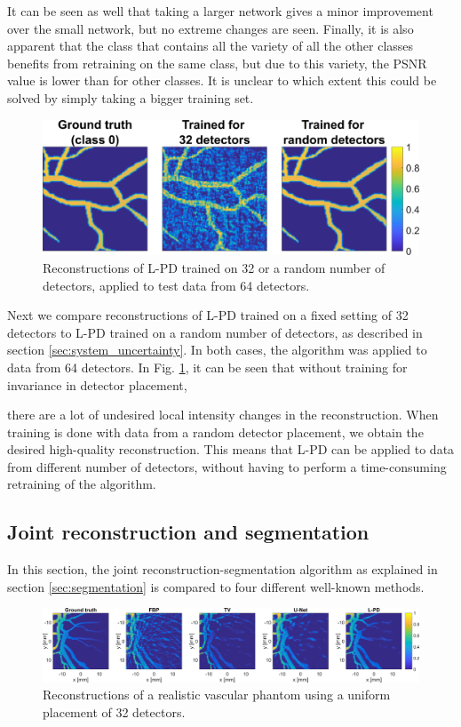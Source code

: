 \documentclass[journal]{IEEEtran}
\newcommand{\hl}[1]{\cbcolor{red}\begin{changebar}{#1}\end{changebar}}
\begin{document}
It can be seen as well that taking a larger network gives a minor improvement over the small network, but no extreme changes are seen. Finally, it is also apparent that the class that contains all the variety of all the other classes benefits from retraining on the same class, but due to this variety, the PSNR value is lower than for other classes. It is unclear to which extent this could be solved by simply taking a bigger training set. 

\begin{figure}[ht!]
\centering
\includegraphics[width=\linewidth]{images/system_changes_im.png}
\caption{Reconstructions of L-PD trained on 32 or a random number of detectors, applied to test data from 64 detectors.}
\label{fig:system_changes_result}
\end{figure}

Next we compare reconstructions of L-PD trained on a fixed setting of 32 detectors to L-PD trained on a random number of detectors, as described in section \ref{sec:system_uncertainty}. In both cases, the algorithm was applied to data from 64 detectors. In Fig. \ref{fig:system_changes_result}, it can be seen that without training for invariance in detector placement, \hl{there are a lot of undesired local intensity changes in the reconstruction. When training is done with data from a random detector placement, we obtain the desired high-quality reconstruction. This means that L-PD can be applied to data from different number of detectors, without having to perform a time-consuming retraining of the algorithm. }

\subsection{Joint reconstruction and segmentation}
In this section, the joint reconstruction-segmentation algorithm as explained in section \ref{sec:segmentation} is compared to four different well-known methods.

\begin{figure}[ht!]
\centering
\includegraphics[width=\linewidth]{images/paper_synthetic_recon.png}
\caption{Reconstructions of a realistic vascular phantom using a uniform placement of 32 detectors.}
\label{fig:synth_recon}
\end{figure}
\end{document}
